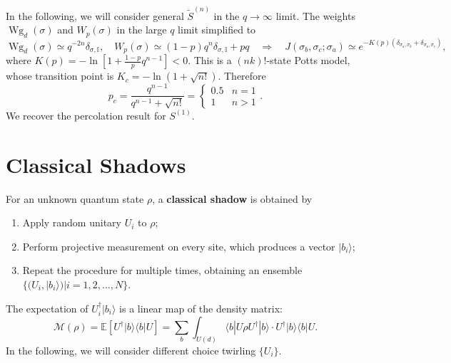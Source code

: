 \documentclass[aps,prb,superscriptaddress,nofootinbib]{revtex4}
\begin{document}
In the following, we will consider general $\tilde S^{(n)}$ in the $q\rightarrow \infty$ limit.
The weights $\operatorname{Wg}_{d}(\sigma)$ and $W_p(\sigma)$ in the large $q$ limit simplified to 
\begin{equation}
	\operatorname{Wg}_d(\sigma) \simeq q^{-2n} \delta_{\sigma,\mathbb I},\quad
	W_p(\sigma) \simeq (1-p)q^{n}\delta_{\sigma,\mathbb I}+pq
	\quad\Longrightarrow\quad
	J(\sigma_b,\sigma_c;\sigma_a) \simeq e^{-K(p)(\delta_{\sigma_a,\sigma_b}+\delta_{\sigma_a,\sigma_c})},
\end{equation}
where $K(p) = -\ln\left[1+\frac{1-p}{p}q^{n-1}\right] < 0$.
This is a $(nk)!$-state Potts model, whose transition point is $K_c = -\ln(1+\sqrt{n!})$.
Therefore
\begin{equation}
	p_c = \frac{q^{n-1}}{q^{n-1}+\sqrt{n!}} = \begin{cases}
		0.5 & n=1 \\
		1 & n >1 
	\end{cases}.
\end{equation}
We recover the percolation result for $S^{(1)}$.




\section{Classical Shadows}

For an unknown quantum state $\rho$, a \textbf{classical shadow} is obtained by
\begin{enumerate}
	\item Apply random unitary $U_i$ to $\rho$;
	\item Perform projective measurement on every site, which produces a vector $|b_i\rangle$;
	\item Repeat the procedure for multiple times, obtaining an ensemble $\{(U_i,|b_i\rangle)|i=1,2,\dots,N\}$.
\end{enumerate}
The expectation of $U_i^\dagger|b_i\rangle$ is a linear map of the density matrix:
\begin{equation}
	\mathcal M(\rho) 
	= \mathbb{E}\left[U^\dagger |b\rangle\langle b|U\right]
	= \sum_b \int_{U(d)} \langle b|U\rho U^\dagger|b\rangle \cdot U^\dagger |b\rangle\langle b|U.
\end{equation}
In the following, we will consider different choice twirling $\{U_i\}$.
\end{document}

